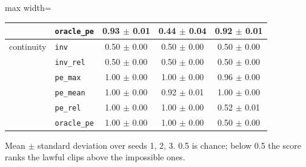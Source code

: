 \begin{table}[t]
\begin{adjustbox}{max width=\linewidth}
\begin{tabular}{llccc}
 & \texttt{oracle\_pe} & 0.93 $\pm$ 0.01 & 0.44 $\pm$ 0.04 & 0.92 $\pm$ 0.01\\
\midrule
continuity & \texttt{inv} & 0.50 $\pm$ 0.00 & 0.50 $\pm$ 0.00 & 0.50 $\pm$ 0.00\\
 & \texttt{inv\_rel} & 0.50 $\pm$ 0.00 & 0.50 $\pm$ 0.00 & 0.50 $\pm$ 0.00\\
 & \texttt{pe\_max} & 1.00 $\pm$ 0.00 & 1.00 $\pm$ 0.00 & 0.96 $\pm$ 0.00\\
 & \texttt{pe\_mean} & 1.00 $\pm$ 0.00 & 0.92 $\pm$ 0.01 & 1.00 $\pm$ 0.00\\
 & \texttt{pe\_rel} & 1.00 $\pm$ 0.00 & 1.00 $\pm$ 0.00 & 0.52 $\pm$ 0.01\\
 & \texttt{oracle\_pe} & 1.00 $\pm$ 0.00 & 1.00 $\pm$ 0.00 & 0.50 $\pm$ 0.00\\
\bottomrule
\end{tabular}\end{adjustbox}
\par\smallskip\footnotesize Mean $\pm$ standard deviation over seeds 1, 2, 3. 0.5 is chance; below 0.5 the score ranks the lawful clips above the impossible ones.
\end{table}

